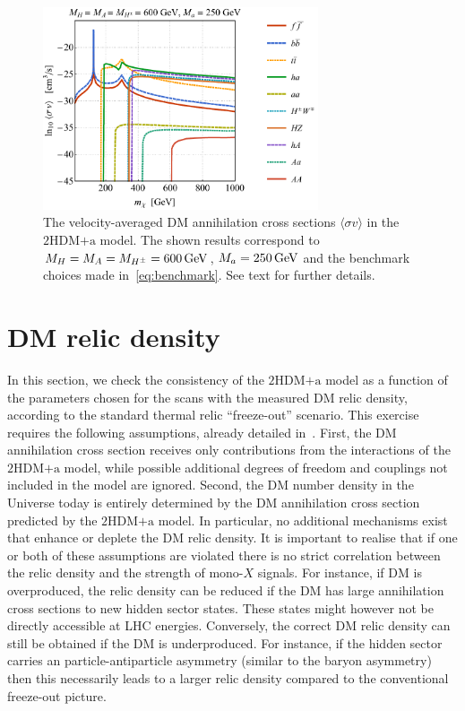 \documentclass[a4paper, 11pt,notoc]{article}
\newcommand{\hdma}{\ensuremath{\textrm{2HDM+a}}\xspace}
\begin{document}
\begin{figure}[t!]
\centering
\includegraphics[width=0.725\textwidth]{IDbenchmark.pdf}
\vspace{4mm}
\caption{The velocity-averaged DM annihilation cross sections $\langle \sigma v \rangle$ in the \hdma model. The shown results correspond to $M_H = M_A = M_{H^\pm} = 600 \, {\rm GeV}$, $M_a = 250 \, {\rm GeV}$ and the benchmark choices made in~\eqref{eq:benchmark}. See text for further details. }
\label{fig:IDbenchmark}
\end{figure}


\section{DM relic density}
\label{sec:relic}

In this section, we check the consistency of the \hdma model as a function of the parameters chosen for the scans with the measured DM relic density, according to the standard thermal relic ``freeze-out'' scenario. This exercise requires the following assumptions, already detailed in~\cite{Albert:2017onk}. First,  the DM annihilation cross section receives only contributions from the interactions of the \hdma model, while possible additional degrees of freedom and couplings not included in the model are ignored. Second, the DM number density in the Universe today is entirely determined by the DM annihilation cross section predicted by the \hdma model. In particular, no additional mechanisms exist that enhance or deplete the DM relic density. It is important to realise that if one or both of these assumptions are violated there is no strict correlation between the relic density and the strength of mono-$X$ signals. For instance, if DM is overproduced, the relic density can be reduced if the DM has large annihilation cross sections to new hidden sector states. These states might however not be directly accessible at LHC energies. Conversely, the correct DM relic density can still be obtained if the DM is underproduced. For instance, if the hidden sector carries an particle-antiparticle asymmetry (similar to the baryon asymmetry) then this necessarily leads to a larger relic density compared to the conventional freeze-out picture.
\end{document}
